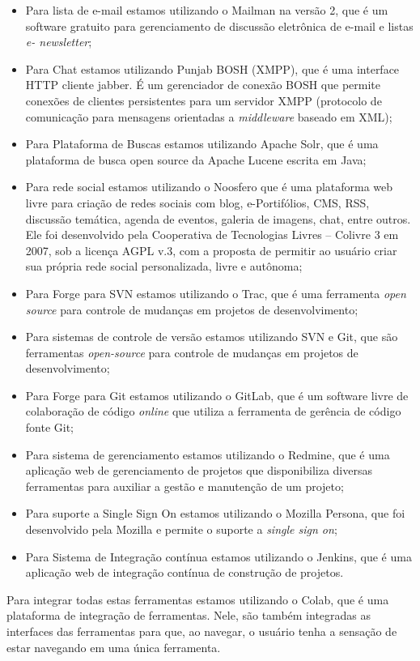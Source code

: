 \begin{itemize}

\item Para lista de e-mail estamos utilizando o Mailman na versão 2, que é um software gratuito para gerenciamento de discussão eletrônica de e-mail e listas {\it e- newsletter};

\item Para Chat estamos utilizando Punjab BOSH (XMPP), que é uma interface HTTP cliente jabber. É um gerenciador de conexão BOSH que permite conexões de clientes persistentes para um servidor XMPP (protocolo de comunicação para mensagens orientadas a {\it middleware} baseado em XML);

\item Para Plataforma de Buscas estamos utilizando Apache Solr, que é uma plataforma de busca open source da Apache Lucene escrita em Java;

\item Para rede social estamos utilizando o Noosfero que é uma plataforma web livre para criação de redes sociais com blog, e-Portifólios, CMS, RSS, discussão temática, agenda de eventos, galeria de imagens, chat, entre outros. Ele foi desenvolvido pela Cooperativa de Tecnologias Livres – Colivre 3 em 2007, sob a licença AGPL v.3, com a proposta de permitir ao usuário criar sua própria rede social personalizada, livre e autônoma;

\item Para Forge para SVN estamos utilizando o Trac, que é uma ferramenta {\it open source} para controle de mudanças em projetos de desenvolvimento;

\item Para sistemas de controle de versão estamos utilizando SVN e Git, que são ferramentas {\it open-source} para controle de mudanças em projetos de desenvolvimento;

\item Para Forge para Git estamos utilizando o GitLab, que é um software livre de colaboração de código {\it online} que utiliza a ferramenta de gerência de código fonte Git;

\item Para sistema de gerenciamento estamos utilizando o Redmine, que é uma aplicação web de gerenciamento de projetos que disponibiliza diversas ferramentas para auxiliar a gestão e manutenção de um projeto;

\item Para suporte a Single Sign On estamos utilizando o Mozilla Persona, que foi desenvolvido pela Mozilla e permite o suporte a {\it single sign on};

\item Para Sistema de Integração contínua estamos utilizando o Jenkins, que é uma aplicação web de integração contínua de construção de projetos.

\end{itemize}

Para integrar todas estas ferramentas estamos utilizando o Colab, que é uma plataforma de integração de ferramentas. Nele, são também integradas as interfaces das ferramentas para que, ao navegar, o usuário tenha a sensação de estar navegando em uma única ferramenta.

